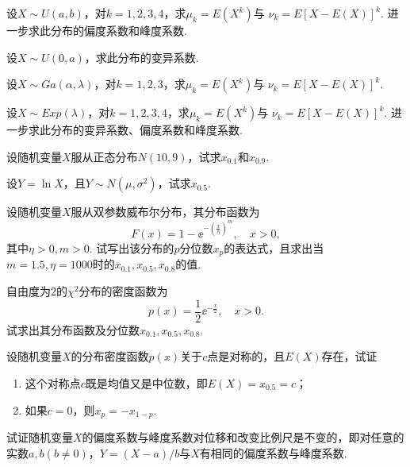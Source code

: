 \begin{xiti}
  \item 设$X\sim U(a,b)$，对$k=1,2,3,4$，求$\mu_k=E(X^k)$与
      $\nu_k=E[X-E(X)]^k$. 进一步求此分布的偏度系数和峰度系数.

  \item 设$X\sim U(0,a)$，求此分布的变异系数.

  \item 设$X\sim Ga(\alpha,\lambda)$，对$k=1,2,3$，求$\mu_k=E(X^k)$与
      $\nu_k=E[X-E(X)]^k$.

  \item 设$X\sim Exp(\lambda)$，对$k=1,2,3,4$，求$\mu_k=E(X^k)$与
      $\nu_k=E[X-E(X)]^k$. 进一步求此分布的变异系数、偏度系数和峰度系数.

  \item 设随机变量$X$服从正态分布$N(10,9)$，试求$x_{0.1}$和$x_{0.9}$.

  \item 设$Y=\ln X$，且$Y\sim N(\mu,\sigma^2)$，试求$x_{0.5}$.

  \item 设随机变量$X$服从双参数威布尔分布，其分布函数为
  \[
    F(x) = 1 - \ee^{-\left(\frac x\eta\right)^m},\quad x > 0,
  \]
  其中$\eta>0,m>0$. 试写出该分布的$p$分位数$x_p$的表达式，且求出当$m=1.5,\eta=1000$时的$x_{0.1},x_{0.5},x_{0.8}$的值.

  \item 自由度为2的$\chi^2$分布的密度函数为
  \[
    p(x) = \frac12 \ee^{-\frac x2},\quad x>0.
  \]
  试求出其分布函数及分位数$x_{0.1},x_{0.5},x_{0.8}$.

  \item 设随机变量$X$的分布密度函数$p(x)$关于$c$点是对称的，且$E(X)$存在，试证
      \begin{enumerate}
        \item 这个对称点$c$既是均值又是中位数，即$E(X)=x_{0.5}=c$；
        \item 如果$c=0$，则$x_p=-x_{1-p}$.
      \end{enumerate}

  \item 试证随机变量$X$的偏度系数与峰度系数对位移和改变比例尺是不变的，即对任意的实数$a,b(b\ne0)$，$Y=(X-a)/b$与$X$有相同的偏度系数与峰度系数.
\end{xiti}










